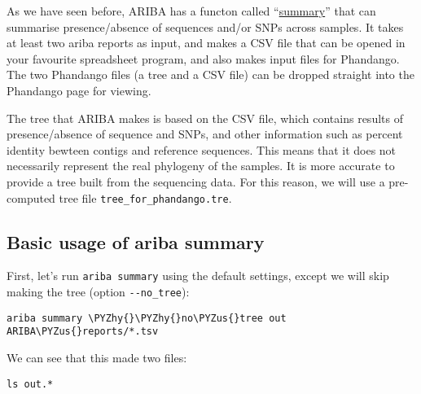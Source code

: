 \documentclass[11pt]{article}
\makeatletter
\def\PYZus{\char`\_}
\def\PYZhy{\char`\-}
\newcommand{\boxspacing}{\kern\kvtcb@left@rule\kern\kvtcb@boxsep}
\newcommand{\prompt}[4]{
        {\ttfamily\llap{{\color{blue}\LARGE\faKeyboardO\hspace{3pt}#4}}\vspace{-\baselineskip}}
    }
\makeatother
\begin{document}
    As we have seen before, ARIBA has a functon called
``\href{https://github.com/sanger-pathogens/ariba/wiki/Task:-summary}{summary}''
that can summarise presence/absence of sequences and/or SNPs across
samples. It takes at least two ariba reports as input, and makes a CSV
file that can be opened in your favourite spreadsheet program, and also
makes input files for Phandango. The two Phandango files (a tree and a
CSV file) can be dropped straight into the Phandango page for viewing.

The tree that ARIBA makes is based on the CSV file, which contains
results of presence/absence of sequence and SNPs, and other information
such as percent identity bewteen contigs and reference sequences. This
means that it does not necessarily represent the real phylogeny of the
samples. It is more accurate to provide a tree built from the sequencing
data. For this reason, we will use a pre-computed tree file
\texttt{tree\_for\_phandango.tre}.

\hypertarget{basic-usage-of-ariba-summary}{%
\subsection{Basic usage of ariba
summary}\label{basic-usage-of-ariba-summary}}

First, let's run \texttt{ariba\ summary} using the default settings,
except we will skip making the tree (option \texttt{-\/-no\_tree}):

    \begin{tcolorbox}[breakable, size=fbox, boxrule=1pt, pad at break*=1mm,colback=cellbackground, colframe=cellborder]
\prompt{In}{incolor}{ }{\boxspacing}
\begin{Verbatim}[commandchars=\\\{\}]
ariba summary \PYZhy{}\PYZhy{}no\PYZus{}tree out ARIBA\PYZus{}reports/*.tsv
\end{Verbatim}
\end{tcolorbox}

    We can see that this made two files:

    \begin{tcolorbox}[breakable, size=fbox, boxrule=1pt, pad at break*=1mm,colback=cellbackground, colframe=cellborder]
\prompt{In}{incolor}{ }{\boxspacing}
\begin{Verbatim}[commandchars=\\\{\}]
ls out.*
\end{Verbatim}
\end{tcolorbox}
\end{document}
